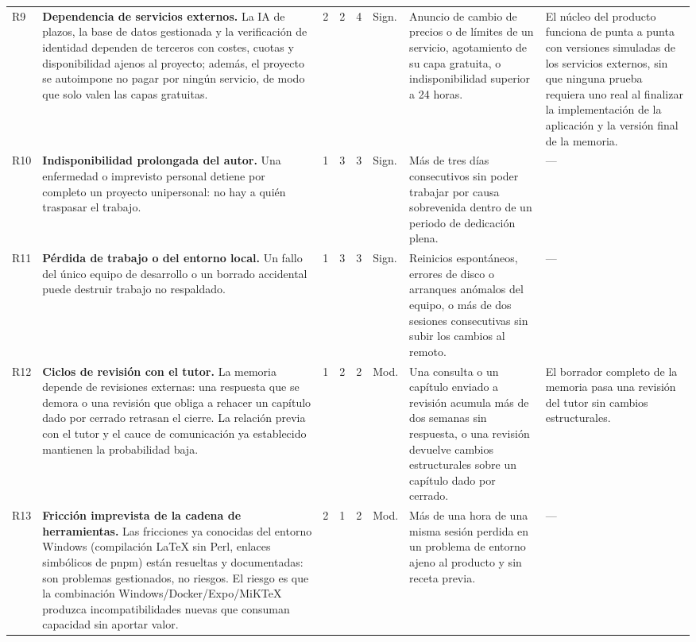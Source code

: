 \begin{longtable}{@{}>{\raggedright\arraybackslash}p{7mm}>{\raggedright\arraybackslash}p{37mm}ccc>{\raggedright\arraybackslash}p{9mm}>{\raggedright\arraybackslash}p{27mm}>{\raggedright\arraybackslash}p{27mm}@{}}
  \addlinespace
  R9 & \textbf{Dependencia de servicios externos.} La \ac{IA} de plazos, la base de datos gestionada y la verificación de identidad dependen de terceros con costes, cuotas y disponibilidad ajenos al proyecto; además, el proyecto se autoimpone no pagar por ningún servicio, de modo que solo valen las capas gratuitas. & 2 & 2 & 4 & Sign. & Anuncio de cambio de precios o de límites de un servicio, agotamiento de su capa gratuita, o indisponibilidad superior a 24 horas. & El núcleo del producto funciona de punta a punta con versiones simuladas de los servicios externos, sin que ninguna prueba requiera uno real al finalizar la implementación de la aplicación y la versión final de la memoria. \\
  \addlinespace
  R10 & \textbf{Indisponibilidad prolongada del autor.} Una enfermedad o imprevisto personal detiene por completo un proyecto unipersonal: no hay a quién traspasar el trabajo. & 1 & 3 & 3 & Sign. & Más de tres días consecutivos sin poder trabajar por causa sobrevenida dentro de un periodo de dedicación plena. & — \\
  \addlinespace
  R11 & \textbf{Pérdida de trabajo o del entorno local.} Un fallo del único equipo de desarrollo o un borrado accidental puede destruir trabajo no respaldado. & 1 & 3 & 3 & Sign. & Reinicios espontáneos, errores de disco o arranques anómalos del equipo, o más de dos sesiones consecutivas sin subir los cambios al remoto. & — \\
  \addlinespace
  R12 & \textbf{Ciclos de revisión con el tutor.} La memoria depende de revisiones externas: una respuesta que se demora o una revisión que obliga a rehacer un capítulo dado por cerrado retrasan el cierre. La relación previa con el tutor y el cauce de comunicación ya establecido mantienen la probabilidad baja. & 1 & 2 & 2 & Mod. & Una consulta o un capítulo enviado a revisión acumula más de dos semanas sin respuesta, o una revisión devuelve cambios estructurales sobre un capítulo dado por cerrado. & El borrador completo de la memoria pasa una revisión del tutor sin cambios estructurales. \\
  \addlinespace
  R13 & \textbf{Fricción imprevista de la cadena de herramientas.} Las fricciones ya conocidas del entorno Windows (compilación LaTeX sin Perl, enlaces simbólicos de pnpm) están resueltas y documentadas: son problemas gestionados, no riesgos. El riesgo es que la combinación Windows/Docker/Expo/MiKTeX produzca incompatibilidades nuevas que consuman capacidad sin aportar valor. & 2 & 1 & 2 & Mod. & Más de una hora de una misma sesión perdida en un problema de entorno ajeno al producto y sin receta previa. & — \\
\end{longtable}
\endgroup


